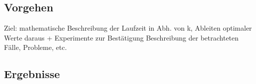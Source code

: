 \documentclass[a4paper, extrafontsizes, ngerman, 25pt]{memoir}
\begin{document}
\subsection{Vorgehen}

Ziel: mathematische Beschreibung der Laufzeit in Abh. von k, Ableiten optimaler Werte daraus + Experimente zur Bestätigung
Beschreibung der betrachteten Fälle, Probleme, etc.

\newpage

\subsection{Ergebnisse}
\end{document}
